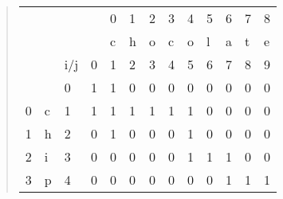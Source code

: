 \begin{quote}
    \begin{table}[H]
        \centering
        \begin{tabular}{lllllllllllll}
            &   &                        &                        & 0                      & 1                      & 2                      & 3                      & 4                      & 5                      & 6                      & 7                      & 8                      \\
            &   &                        &                        & c                      & h                      & o                      & c                      & o                      & l                      & a                      & t                      & e                      \\
            &   & i/j                    & 0                      & 1                      & 2                      & 3                      & 4                      & 5                      & 6                      & 7                      & 8                      & 9                      \\ \cline{4-13} 
            &   & \multicolumn{1}{l|}{0} & \multicolumn{1}{l|}{1} & \multicolumn{1}{l|}{1} & \multicolumn{1}{l|}{0} & \multicolumn{1}{l|}{0} & \multicolumn{1}{l|}{0} & \multicolumn{1}{l|}{0} & \multicolumn{1}{l|}{0} & \multicolumn{1}{l|}{0} & \multicolumn{1}{l|}{0} & \multicolumn{1}{l|}{0} \\ \cline{4-13} 
          0 & c & \multicolumn{1}{l|}{1} & \multicolumn{1}{l|}{1} & \multicolumn{1}{l|}{1} & \multicolumn{1}{l|}{1} & \multicolumn{1}{l|}{1} & \multicolumn{1}{l|}{1} & \multicolumn{1}{l|}{1} & \multicolumn{1}{l|}{0} & \multicolumn{1}{l|}{0} & \multicolumn{1}{l|}{0} & \multicolumn{1}{l|}{0} \\ \cline{4-13} 
          1 & h & \multicolumn{1}{l|}{2} & \multicolumn{1}{l|}{0} & \multicolumn{1}{l|}{1} & \multicolumn{1}{l|}{0} & \multicolumn{1}{l|}{0} & \multicolumn{1}{l|}{0} & \multicolumn{1}{l|}{1} & \multicolumn{1}{l|}{0} & \multicolumn{1}{l|}{0} & \multicolumn{1}{l|}{0} & \multicolumn{1}{l|}{0} \\ \cline{4-13} 
          2 & i & \multicolumn{1}{l|}{3} & \multicolumn{1}{l|}{0} & \multicolumn{1}{l|}{0} & \multicolumn{1}{l|}{0} & \multicolumn{1}{l|}{0} & \multicolumn{1}{l|}{0} & \multicolumn{1}{l|}{1} & \multicolumn{1}{l|}{1} & \multicolumn{1}{l|}{1} & \multicolumn{1}{l|}{0} & \multicolumn{1}{l|}{0} \\ \cline{4-13} 
          3 & p & \multicolumn{1}{l|}{4} & \multicolumn{1}{l|}{0} & \multicolumn{1}{l|}{0} & \multicolumn{1}{l|}{0} & \multicolumn{1}{l|}{0} & \multicolumn{1}{l|}{0} & \multicolumn{1}{l|}{0} & \multicolumn{1}{l|}{0} & \multicolumn{1}{l|}{1} & \multicolumn{1}{l|}{1} & \multicolumn{1}{l|}{1} \\ \cline{4-13} 

\end{tabular}
\end{table}
\end{quote}

